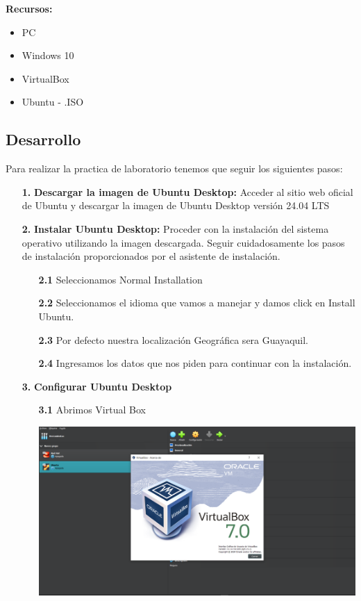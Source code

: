 \documentclass[11pt,twoside]{book}
\begin{document}
\textbf{Recursos:}
\begin{itemize}
  \item PC
  \item Windows 10
  \item VirtualBox
  \item Ubuntu - .ISO
\end{itemize}

\subsection*{Desarrollo}
Para realizar la practica de laboratorio tenemos que seguir los siguientes pasos:
\begin{enumerate}
  \item[\textbf{1.}] \textbf{Descargar la imagen de Ubuntu Desktop:} Acceder al sitio web oficial de Ubuntu y descargar la imagen de Ubuntu Desktop versión 24.04 LTS
  \item[\textbf{2.}] \textbf{Instalar Ubuntu Desktop: } Proceder con la instalación del sistema operativo utilizando la imagen descargada. Seguir cuidadosamente los pasos de instalación proporcionados por el asistente de instalación.
  \begin{enumerate}
    \item[\textbf{2.1}] Seleccionamos Normal Installation 
    \item[\textbf{2.2}] Seleccionamos el idioma que vamos a manejar y damos click en Install Ubuntu.
    \item[\textbf{2.3}] Por defecto nuestra localización Geográfica sera Guayaquil.
        \item[\textbf{2.4}] Ingresamos los datos que nos piden para continuar con la instalación.\\
\end{enumerate}
\item[\textbf{3.}] \textbf{Configurar Ubuntu Desktop}
\begin{enumerate}
    \item[\textbf{3.1}] Abrimos Virtual Box
    
    \begin{minipage}{\linewidth}
        \centering
        \includegraphics[width=0.5\linewidth]{VB.png}
        \label{fig:etiqueta}
    \end{minipage}\\
    

\end{enumerate}
\end{enumerate}
\end{document}
